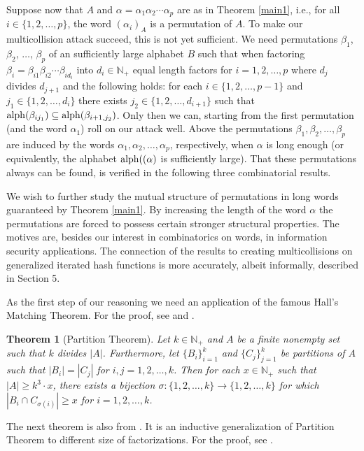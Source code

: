 \documentclass[submission,copyright,creativecommons]{eptcs}
\newcommand{\N}{\mathbb N}
\newcommand{\alp}{{\rm alph}}
\newtheorem{theorem}{Theorem}
\begin{document}
Suppose now that $A$ and $\alpha = \alpha_1\alpha_2 \cdots \alpha_p$ are as in Theorem \ref{main1}, i.e., for all $i\in\{1,2, \ldots, p\}$, the word $(\alpha_i)_A$ is a permutation of $A$. To make our multicollision attack succeed, this is not yet sufficient. We need permutations  $\beta_1$, $\beta_2$, $\ldots$, $\beta_p$ of an sufficiently large alphabet $B$ such that when factoring $\beta_i=\beta_{i1}\beta_{i2}\cdots\beta_{id_i}$ into  $d_i\in\N_+$ equal length factors for $i=1,2,\ldots,p$ where $d_j$ divides $d_{j+1}$ and the following holds: for each $i\in\{1,2,\ldots,p-1\}$ and $j_1\in\{1,2,\ldots,d_i\}$ there exists $j_2\in\{1,2,\ldots,d_{i+1}\}$ such that $\alp(\beta_{ij_1})\subseteq\alp(\beta_{i+1,j_2})$. Only then we can, starting from the first permutation (and the word $\alpha_1$) roll on our attack well. Above the permutations $\beta_1,\beta_2,\ldots,\beta_p$ are induced by the words $\alpha_1,\alpha_2, \ldots, \alpha_p$, respectively, when $\alpha$ is long enough (or equivalently, the alphabet $\alp((\alpha)$ is sufficiently large). That these permutations always can be found, is verified in the following three combinatorial results. 


We wish to further study the mutual structure of permutations in long words guaranteed by Theorem \ref{main1}. By increasing the length of the word $\alpha$ the permutations are forced to possess certain stronger structural properties. The motives are, besides our interest in combinatorics on words, in information security applications. The connection of the results to creating multicollisions on generalized iterated hash functions is more accurately, albeit informally, described in Section 5.

As the first step of our reasoning we need an application of the famous Hall's Matching Theorem. For the proof, see  \cite{KHK} and \cite{HoS}.

\begin{theorem}[Partition Theorem] \label{part}
Let $k\in\N_+$ and $A$ be a finite nonempty set such that $k$ divides
$|A|$. Furthermore, let $\{B_i\}_{i=1}^k$ and $\{C_j\}_{j=1}^k$ be
partitions of $A$ such that $|B_i|=|C_j|$ for $i,j=1,2,\ldots,k$. Then
for each $x\in\N_+$ such that $|A|\geq k^3\cdot x$, there exists a
bijection $\sigma: \{1,2,\ldots,k\}\rightarrow \{1,2,\ldots,k\}$ for
which $|B_i\cap C_{\sigma(i)}|\geq x$ for $i=1,2,\ldots,k$.
\end{theorem}

The next theorem is also from \cite{KHK}. It is an inductive generalization of Partition Theorem to different size of factorizations. For the proof, see \cite{KHK}.
\end{document}
